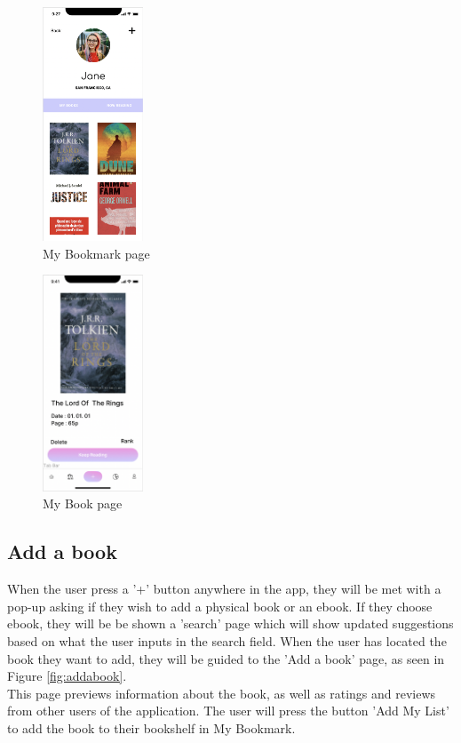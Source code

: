 \documentclass[conference]{IEEEtran}
\begin{document}
\begin{figure}[h]
    \centering
    \includegraphics[width=3cm]{Ressources/Specifications/mybookmark.png}
    \caption{My Bookmark page}
    \label{fig:mybookmark}
\end{figure}

\begin{figure}[h]
    \centering
    \includegraphics[width=3cm]{Ressources/Specifications/book.png}
    \caption{My Book page}
    \label{fig:book}
\end{figure}

\subsection{Add a book}
When the user press a '+' button anywhere in the app, they will be met with a pop-up asking if they wish to add a physical book or an ebook. If they choose ebook, they will be be shown a 'search' page which will show updated suggestions based on what the user inputs in the search field. When the user has located the book they want to add, they will be guided to the 'Add a book' page, as seen in Figure \ref{fig:addabook}. \\
This page previews information about the book, as well as ratings and reviews from other users of the application. The user will press the button 'Add My List' to add the book to their bookshelf in My Bookmark.\\
\end{document}
